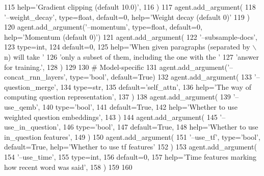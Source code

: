 \begin{DoxyCode}
115         help=\textcolor{stringliteral}{'Gradient clipping (default 10.0)'},
116     )
117     agent.add\_argument(
118         \textcolor{stringliteral}{'--weight\_decay'}, type=float, default=0, help=\textcolor{stringliteral}{'Weight decay (default 0)'}
119     )
120     agent.add\_argument(\textcolor{stringliteral}{'--momentum'}, type=float, default=0, help=\textcolor{stringliteral}{'Momentum (default 0)'})
121     agent.add\_argument(
122         \textcolor{stringliteral}{'--subsample-docs'},
123         type=int,
124         default=0,
125         help=\textcolor{stringliteral}{'When given paragraphs (separated by \(\backslash\)n) will take '}
126         \textcolor{stringliteral}{'only a subset of them, including the one with the '}
127         \textcolor{stringliteral}{'answer for training.'},
128     )
129 
130     \textcolor{comment}{# Model-specific}
131     agent.add\_argument(\textcolor{stringliteral}{'--concat\_rnn\_layers'}, type=\textcolor{stringliteral}{'bool'}, default=\textcolor{keyword}{True})
132     agent.add\_argument(
133         \textcolor{stringliteral}{'--question\_merge'},
134         type=str,
135         default=\textcolor{stringliteral}{'self\_attn'},
136         help=\textcolor{stringliteral}{'The way of computing question representation'},
137     )
138     agent.add\_argument(
139         \textcolor{stringliteral}{'--use\_qemb'},
140         type=\textcolor{stringliteral}{'bool'},
141         default=\textcolor{keyword}{True},
142         help=\textcolor{stringliteral}{'Whether to use weighted question embeddings'},
143     )
144     agent.add\_argument(
145         \textcolor{stringliteral}{'--use\_in\_question'},
146         type=\textcolor{stringliteral}{'bool'},
147         default=\textcolor{keyword}{True},
148         help=\textcolor{stringliteral}{'Whether to use in\_question features'},
149     )
150     agent.add\_argument(
151         \textcolor{stringliteral}{'--use\_tf'}, type=\textcolor{stringliteral}{'bool'}, default=\textcolor{keyword}{True}, help=\textcolor{stringliteral}{'Whether to use tf features'}
152     )
153     agent.add\_argument(
154         \textcolor{stringliteral}{'--use\_time'},
155         type=int,
156         default=0,
157         help=\textcolor{stringliteral}{'Time features marking how recent word was said'},
158     )
159 
160 
\end{DoxyCode}
\mbox{\label{namespaceparlai_1_1agents_1_1drqa_1_1config_a0fd9c7cd1129e5b4a7c0315b9f03c31a}} 
